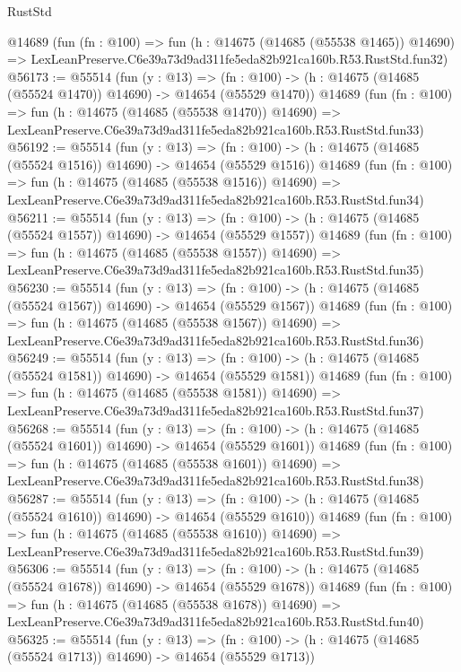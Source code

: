 \begin{lexlean}{RustStd}
\begin{coremodule}
    @14689
    (fun (fn : @100) =>
    fun (h : @14675 (@14685 (@55538 @1465)) @14690) =>
    LexLeanPreserve.C6e39a73d9ad311fe5eda82b921ca160b.R53.RustStd.fun32)
@56173 := @55514
    (fun (y : @13) =>
    (fn : @100) -> (h : @14675 (@14685 (@55524 @1470)) @14690) -> @14654 (@55529 @1470))
    @14689
    (fun (fn : @100) =>
    fun (h : @14675 (@14685 (@55538 @1470)) @14690) =>
    LexLeanPreserve.C6e39a73d9ad311fe5eda82b921ca160b.R53.RustStd.fun33)
@56192 := @55514
    (fun (y : @13) =>
    (fn : @100) -> (h : @14675 (@14685 (@55524 @1516)) @14690) -> @14654 (@55529 @1516))
    @14689
    (fun (fn : @100) =>
    fun (h : @14675 (@14685 (@55538 @1516)) @14690) =>
    LexLeanPreserve.C6e39a73d9ad311fe5eda82b921ca160b.R53.RustStd.fun34)
@56211 := @55514
    (fun (y : @13) =>
    (fn : @100) -> (h : @14675 (@14685 (@55524 @1557)) @14690) -> @14654 (@55529 @1557))
    @14689
    (fun (fn : @100) =>
    fun (h : @14675 (@14685 (@55538 @1557)) @14690) =>
    LexLeanPreserve.C6e39a73d9ad311fe5eda82b921ca160b.R53.RustStd.fun35)
@56230 := @55514
    (fun (y : @13) =>
    (fn : @100) -> (h : @14675 (@14685 (@55524 @1567)) @14690) -> @14654 (@55529 @1567))
    @14689
    (fun (fn : @100) =>
    fun (h : @14675 (@14685 (@55538 @1567)) @14690) =>
    LexLeanPreserve.C6e39a73d9ad311fe5eda82b921ca160b.R53.RustStd.fun36)
@56249 := @55514
    (fun (y : @13) =>
    (fn : @100) -> (h : @14675 (@14685 (@55524 @1581)) @14690) -> @14654 (@55529 @1581))
    @14689
    (fun (fn : @100) =>
    fun (h : @14675 (@14685 (@55538 @1581)) @14690) =>
    LexLeanPreserve.C6e39a73d9ad311fe5eda82b921ca160b.R53.RustStd.fun37)
@56268 := @55514
    (fun (y : @13) =>
    (fn : @100) -> (h : @14675 (@14685 (@55524 @1601)) @14690) -> @14654 (@55529 @1601))
    @14689
    (fun (fn : @100) =>
    fun (h : @14675 (@14685 (@55538 @1601)) @14690) =>
    LexLeanPreserve.C6e39a73d9ad311fe5eda82b921ca160b.R53.RustStd.fun38)
@56287 := @55514
    (fun (y : @13) =>
    (fn : @100) -> (h : @14675 (@14685 (@55524 @1610)) @14690) -> @14654 (@55529 @1610))
    @14689
    (fun (fn : @100) =>
    fun (h : @14675 (@14685 (@55538 @1610)) @14690) =>
    LexLeanPreserve.C6e39a73d9ad311fe5eda82b921ca160b.R53.RustStd.fun39)
@56306 := @55514
    (fun (y : @13) =>
    (fn : @100) -> (h : @14675 (@14685 (@55524 @1678)) @14690) -> @14654 (@55529 @1678))
    @14689
    (fun (fn : @100) =>
    fun (h : @14675 (@14685 (@55538 @1678)) @14690) =>
    LexLeanPreserve.C6e39a73d9ad311fe5eda82b921ca160b.R53.RustStd.fun40)
@56325 := @55514
    (fun (y : @13) =>
    (fn : @100) -> (h : @14675 (@14685 (@55524 @1713)) @14690) -> @14654 (@55529 @1713))

\end{coremodule}
\end{lexlean}
